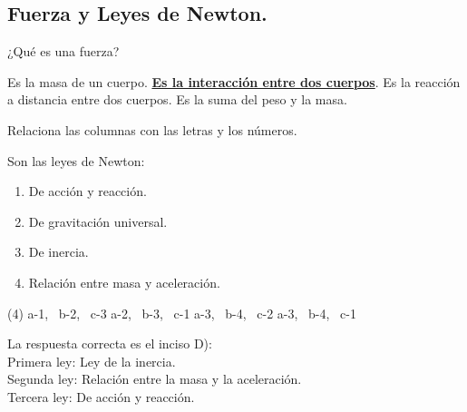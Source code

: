 \documentclass[12pt, letter]{exam}
\begin{document}
\begin{questions}
    \section{Fuerza y Leyes de Newton.}

    \question ¿Qué es una fuerza?
    \begin{tasks}
        \task Es la masa de un cuerpo.
        \task \underline{\textbf{Es la interacción entre dos cuerpos}}.
        \task Es la reacción a distancia entre dos cuerpos.
        \task Es la suma del peso y la masa.
    \end{tasks}
    \question Relaciona las columnas con las letras y los números.
    
    Son las leyes de Newton:
    
    \begin{minipage}[t]{0.4\linewidth}
    \end{minipage}
    \hspace{-0.5cm}
    \begin{minipage}[t]{0.5\linewidth}
        \begin{enumerate}[label=\arabic*)]
            \itemsep0em
            \item De acción y reacción.
            \item De gravitación universal.
            \item De inercia.
            \item Relación entre masa y aceleración.
        \end{enumerate}
    \end{minipage}
    \begin{tasks}(4)
        \task a-1, \, b-2, \, c-3
        \task a-2, \, b-3, \, c-1
        \task a-3, \, b-4, \, c-2
        \task a-3, \, b-4, \, c-1
    \end{tasks}
    La respuesta correcta es el inciso D):
    \\
    Primera ley: Ley de la inercia. \\
    Segunda ley: Relación entre la masa y la aceleración. \\
    Tercera ley: De acción y reacción.
    

\end{questions}
\end{document}
